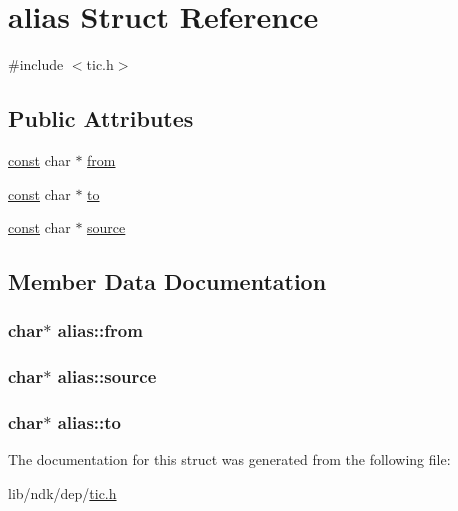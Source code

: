 \hypertarget{structalias}{\section{alias Struct Reference}
\label{structalias}
}


{\ttfamily \#include $<$tic.\-h$>$}

\subsection*{Public Attributes}
\begin{DoxyCompactItemize}
\item 
\hyperlink{term__entry_8h_a57bd63ce7f9a353488880e3de6692d5a}{const} char $\ast$ \hyperlink{structalias_a979b5070932cc1985006790b3563fd40}{from}
\item 
\hyperlink{term__entry_8h_a57bd63ce7f9a353488880e3de6692d5a}{const} char $\ast$ \hyperlink{structalias_a9c16e819d3233d206c4651ab21098636}{to}
\item 
\hyperlink{term__entry_8h_a57bd63ce7f9a353488880e3de6692d5a}{const} char $\ast$ \hyperlink{structalias_ad1422e6345b6ffe4632ed92b329b0426}{source}
\end{DoxyCompactItemize}


\subsection{Member Data Documentation}
\hypertarget{structalias_a979b5070932cc1985006790b3563fd40}{
\subsubsection[{from}]{ char$\ast$ alias\-::from}}\label{structalias_a979b5070932cc1985006790b3563fd40}
\hypertarget{structalias_ad1422e6345b6ffe4632ed92b329b0426}{
\subsubsection[{source}]{ char$\ast$ alias\-::source}}\label{structalias_ad1422e6345b6ffe4632ed92b329b0426}
\hypertarget{structalias_a9c16e819d3233d206c4651ab21098636}{
\subsubsection[{to}]{ char$\ast$ alias\-::to}}\label{structalias_a9c16e819d3233d206c4651ab21098636}


The documentation for this struct was generated from the following file\-:\begin{DoxyCompactItemize}
\item 
lib/ndk/dep/\hyperlink{tic_8h}{tic.\-h}\end{DoxyCompactItemize}
